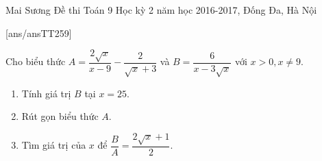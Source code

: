 \begin{name}
{Mai Sương}
{Đề thi Toán 9 Học kỳ 2 năm học 2016-2017, Đống Đa, Hà Nội}
\end{name}
\setcounter{ex}{0}
[ans/ansTT259]
\begin{ex}%
	Cho biểu thức $A=\dfrac{2\sqrt{x}}{x-9}-\dfrac{2}{\sqrt{x}+3}$ và $B=\dfrac{6}{x-3\sqrt{x}}$ với $x>0,x\ne 9$.
	\begin{enumerate}
	\item Tính giá trị $B$ tại $x=25$.
	\item Rút gọn biểu thức $A$.
	\item Tìm giá trị của $x$ để $\dfrac{B}{A}=\dfrac{2\sqrt{x}+1}{2}$.
	\end{enumerate}
\end{ex}

